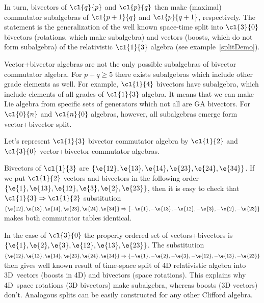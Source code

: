 \begin{unit}
\begin{itemize}
In turn, bivectors of $\cl{q}{p}$ and $\cl{p}{q}$ then make (maximal) commutator subalgebras of $\cl{p+1}{q}$ and $\cl{p}{q+1}$, respectively. The statement is the generalization of the well known space-time split into $\cl{3}{0}$ bivectors (rotations, which make subalgebra) and vectors (boosts, which do not form subalgebra) of the relativistic $\cl{1}{3}$ algebra (see example~\ref{splitDemo}).

Vector+bivector algebras are not the only possible subalgebras of
bivector commutator algebra.  For $p+q\ge5$ there exists
subalgebras which include other grade elements as well. For
example, $\cl{1}{4}$ bivectors have subalgebra, which include
elements of all grades of $\cl{1}{3}$ algebra. It means that
we can make Lie algebra from specific sets of generators which not
all are GA bivectors. For  $\cl{0}{n}$ and $\cl{n}{0}$ algebras,
however, all subalgebras emerge form vector+bivector split.\\
\end{itemize}
\end{unit}
\begin{example}\label{splitDemo}
Let's represent $\cl{1}{3}$ bivector commutator algebra by $\cl{1}{2}$ and $\cl{3}{0}$ vector+bivector commutator algebras.

Bivectors of $\cl{1}{3}$ are $\{\e{12},\e{13},\e{14},\e{23},\e{24},\e{34}\}$. If we put $\cl{1}{2}$ vectors and bivectors in the following order $\{\e{1},\e{13},\e{12},\e{3},\e{2},\e{23}\}$, then it is easy to check that $\cl{1}{3}\Rightarrow \cl{1}{2}$ substitution  $\{\e{12},\e{13},\e{14},\e{23},\e{24},\e{34}\}\Rightarrow \{-\e{1},-\e{13},-\e{12},-\e{3},-\e{2},-\e{23}\}$
makes both commutator tables identical.

In the case of $\cl{3}{0}$ the properly ordered set of vectors+bivectors is $\{\e{1},\e{2},\e{3},\e{12},\e{13},\e{23}\}$. The substitution 
$\{\e{12},\e{13},\e{14},\e{23},\e{24},\e{34}\}\Rightarrow \{-\e{1}, -\e{2}, -\e{3}, -\e{12}, -\e{13}, -\e{23}\}$ then gives well known result of time-space split of 4D relativistic algebra into 3D~vectors (boosts in 4D) and bivectors (space rotations). This explains why 4D~space rotations (3D bivectors) make subalgebra, whereas boosts (3D vectors) don't. Analogous splits can be easily constructed for any other Clifford algebra.
\end{example}
%

